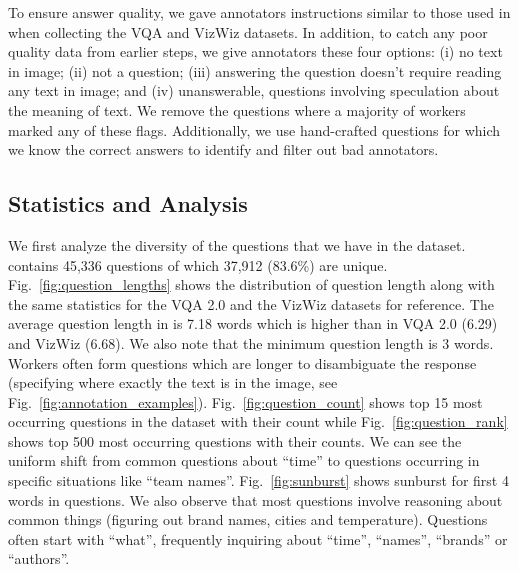 \documentclass[10pt,twocolumn,letterpaper]{article}
\begin{document}
To ensure answer quality, we gave annotators instructions similar to those used in \cite{antol2015vqa,gurari2018vizwiz} when collecting the VQA and VizWiz datasets.
In addition, to catch any poor quality data from earlier steps,
we give annotators these four options: 
(i) no text in image; (ii) not a question; (iii) answering the question doesn't require reading any text in image; and (iv) unanswerable, \eg questions 
involving speculation about the meaning of text.
We remove the questions where a majority of  workers marked any of these flags. Additionally, we use hand-crafted questions for which we know the correct answers to identify and filter out bad annotators. 

\subsection{Statistics and Analysis}

We first analyze the diversity of the questions that we have in the dataset. \datasetName contains 45,336 questions of which 37,912 (83.6\%) are unique. 
Fig.~\ref{fig:question_lengths} shows the distribution of question length along with the same statistics for the VQA 2.0 and the VizWiz datasets for reference.
The average question length in \datasetName is 7.18 words which is higher than in  VQA 2.0 (6.29) and VizWiz (6.68). We also note that the minimum question length is 3 words. Workers often form questions which are longer to disambiguate the response (\eg specifying where exactly the text is in the image, see Fig.~\ref{fig:annotation_examples}).
Fig.~\ref{fig:question_count} shows top 15 most occurring questions in the dataset with their count while Fig.~\ref{fig:question_rank} shows top 500 most occurring questions 
with their counts. We can see the uniform shift from common questions about ``time'' to questions occurring in specific situations like ``team names''. Fig.~\ref{fig:sunburst} shows sunburst for first 4 words in questions. 
We also observe that most questions involve reasoning about common things (\eg figuring out brand names, cities and temperature). 
Questions often start with ``what'', 
frequently inquiring about ``time'', ``names'', ``brands'' or ``authors''.
\end{document}

